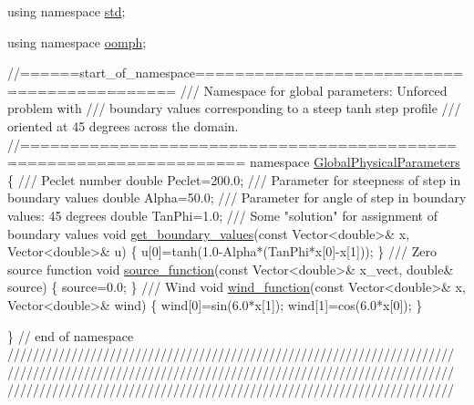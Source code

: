 \begin{DoxyCodeInclude}
\textcolor{keyword}{using namespace }\hyperlink{namespacestd}{std};

\textcolor{keyword}{using namespace }\hyperlink{namespaceoomph}{oomph};


 
\textcolor{comment}{//======start\_of\_namespace============================================}\textcolor{comment}{}
\textcolor{comment}{/// Namespace for global parameters: Unforced problem with}
\textcolor{comment}{/// boundary values corresponding to a steep tanh step profile}
\textcolor{comment}{/// oriented at 45 degrees across the domain.}
\textcolor{comment}{}\textcolor{comment}{//====================================================================}
\textcolor{keyword}{namespace }\hyperlink{namespaceGlobalPhysicalParameters}{GlobalPhysicalParameters}
\{
\textcolor{comment}{}
\textcolor{comment}{ /// Peclet number}
\textcolor{comment}{} \textcolor{keywordtype}{double} Peclet=200.0;
\textcolor{comment}{}
\textcolor{comment}{ /// Parameter for steepness of step in boundary values}
\textcolor{comment}{} \textcolor{keywordtype}{double} Alpha=50.0;
\textcolor{comment}{}
\textcolor{comment}{ /// Parameter for angle of step in boundary values: 45 degrees}
\textcolor{comment}{} \textcolor{keywordtype}{double} TanPhi=1.0;
\textcolor{comment}{}
\textcolor{comment}{ /// Some "solution" for assignment of boundary values}
\textcolor{comment}{} \textcolor{keywordtype}{void} \hyperlink{namespaceGlobalPhysicalParameters_a6e1db5726436a705e9d400fedf914cef}{get\_boundary\_values}(\textcolor{keyword}{const} Vector<double>& x, Vector<double>& u)
 \{
  u[0]=tanh(1.0-Alpha*(TanPhi*x[0]-x[1]));
 \}
\textcolor{comment}{}
\textcolor{comment}{ /// Zero source function}
\textcolor{comment}{} \textcolor{keywordtype}{void} \hyperlink{namespaceGlobalPhysicalParameters_aa84986d4d50cb043cc8fced56feab45f}{source\_function}(\textcolor{keyword}{const} Vector<double>& x\_vect, \textcolor{keywordtype}{double}& source)
 \{
  source=0.0;
 \}
\textcolor{comment}{}
\textcolor{comment}{ /// Wind}
\textcolor{comment}{} \textcolor{keywordtype}{void} \hyperlink{namespaceGlobalPhysicalParameters_a3a17e62bc0096244627f5f1a7f53c859}{wind\_function}(\textcolor{keyword}{const} Vector<double>& x, Vector<double>& wind)
 \{
  wind[0]=sin(6.0*x[1]);
  wind[1]=cos(6.0*x[0]);
 \}

 
\} \textcolor{comment}{// end of namespace}
\textcolor{comment}{}
\textcolor{comment}{//////////////////////////////////////////////////////////////////////}
\textcolor{comment}{//////////////////////////////////////////////////////////////////////}
\textcolor{comment}{//////////////////////////////////////////////////////////////////////}
\textcolor{comment}{}


\end{DoxyCodeInclude}
